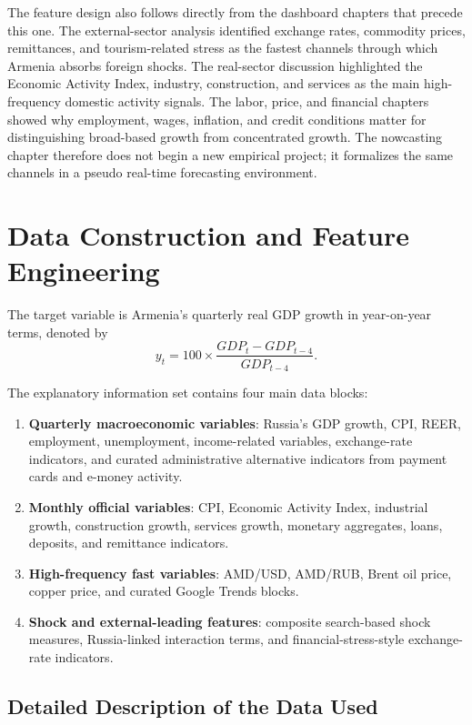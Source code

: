 \documentclass[12pt,a4paper]{report}
\begin{document}
The feature design also follows directly from the dashboard chapters that precede this one. The external-sector analysis identified exchange rates, commodity prices, remittances, and tourism-related stress as the fastest channels through which Armenia absorbs foreign shocks. The real-sector discussion highlighted the Economic Activity Index, industry, construction, and services as the main high-frequency domestic activity signals. The labor, price, and financial chapters showed why employment, wages, inflation, and credit conditions matter for distinguishing broad-based growth from concentrated growth. The nowcasting chapter therefore does not begin a new empirical project; it formalizes the same channels in a pseudo real-time forecasting environment.

\section{Data Construction and Feature Engineering}

The target variable is Armenia's quarterly real GDP growth in year-on-year terms, denoted by
\begin{equation}
    y_t = 100 \times \frac{GDP_t - GDP_{t-4}}{GDP_{t-4}}.
\end{equation}

The explanatory information set contains four main data blocks:
\begin{enumerate}
    \item \textbf{Quarterly macroeconomic variables}: Russia's GDP growth, CPI, REER, employment, unemployment, income-related variables, exchange-rate indicators, and curated administrative alternative indicators from payment cards and e-money activity.
    \item \textbf{Monthly official variables}: CPI, Economic Activity Index, industrial growth, construction growth, services growth, monetary aggregates, loans, deposits, and remittance indicators.
    \item \textbf{High-frequency fast variables}: AMD/USD, AMD/RUB, Brent oil price, copper price, and curated Google Trends blocks.
    \item \textbf{Shock and external-leading features}: composite search-based shock measures, Russia-linked interaction terms, and financial-stress-style exchange-rate indicators.
\end{enumerate}

\subsection{Detailed Description of the Data Used}
\end{document}
